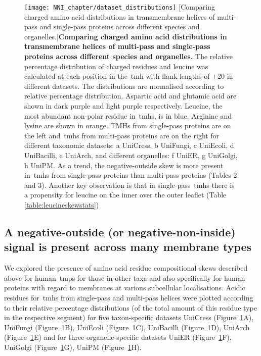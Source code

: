 \begin{figure}[!ht]
\centering
\texttt{[image: NNI\_chapter/dataset\_distributions]}
[Comparing charged amino acid distributions in transmembrane helices of multi-pass and single-pass proteins across different species and organelles.]{\textbf{Comparing charged amino acid distributions in transmembrane helices of multi-pass and single-pass proteins across different species and organelles.} The relative percentage distribution of charged residues and leucine was calculated at each position in the~\gls{tmh} with flank lengths of $\pm$20 in different datasets.
The distributions are normalised according to relative percentage distribution.
Aspartic acid and glutamic acid are shown in dark purple and light purple respectively.
Leucine, the most abundant non-polar residue in~\gls{tmh}s, is in blue.
Arginine and lysine are shown in orange.
TMHs from single-pass proteins are on the left and~\gls{tmh}s from multi-pass proteins are on the right for different taxonomic datasets: a UniCress, b UniFungi, c UniEcoli, d UniBacilli, e UniArch, and different organelles: f UniER, g UniGolgi, h UniPM.
As a trend, the negative-outside skew is more present in~\gls{tmh}s from single-pass proteins than multi-pass proteins (Tables 2 and 3).
Another key observation is that in single-pass~\gls{tmh}s there is a propensity for leucine on the inner over the outer leaflet (Table \ref{table:leucineskewstats})}


\label{fig:dataset_distributions}
\end{figure}

\subsection{A negative-outside (or negative-non-inside) signal is present across many membrane types}

We explored the presence of amino acid residue compositional skews described above for human~\gls{tmp}s for those in other taxa and also specifically for human proteins with regard to membranes at various subcellular localisations.
Acidic residues for~\gls{tmh}s from single-pass and multi-pass helices were plotted according to their relative percentage distributions (of the total amount of this residue type in the respective segment) for five taxon-specific datasets UniCress (Figure~\ref{fig:dataset_distributions}A), UniFungi (Figure~\ref{fig:dataset_distributions}B), UniEcoli (Figure~\ref{fig:dataset_distributions}C), UniBacilli (Figure~\ref{fig:dataset_distributions}D), UniArch (Figure~\ref{fig:dataset_distributions}E) and for three organelle-specific datasets UniER (Figure~\ref{fig:dataset_distributions}F), UniGolgi (Figure~\ref{fig:dataset_distributions}G), UniPM (Figure~\ref{fig:dataset_distributions}H).

